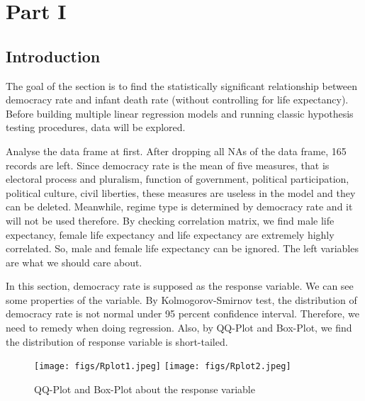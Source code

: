 
\section{Part I}

\subsection{Introduction}
The goal of the section is to find the statistically significant relationship between democracy rate and infant death rate (without controlling for life expectancy). Before building multiple linear regression models and running classic hypothesis testing procedures, data will be explored.

Analyse the data frame at first. After dropping all NAs of the data frame, 165 records are left. Since democracy rate is the mean of five measures, that is electoral process and pluralism, function of government, political participation, political culture, civil liberties, these measures are useless in the model and they can be deleted. Meanwhile, regime type is determined by democracy rate and it will not be used therefore. By checking correlation matrix, we find male life expectancy, female life expectancy and life expectancy are extremely highly correlated. So, male and female life expectancy can be ignored. The left variables are what we should care about.

In this section, democracy rate is supposed as the response variable. We can see some properties of the variable. By Kolmogorov-Smirnov test, the distribution of democracy rate is not normal under 95 percent confidence interval. Therefore, we need to remedy when doing regression. Also, by QQ-Plot and Box-Plot, we find the distribution of response variable is short-tailed.

\begin{figure}[!htbp]
\centering 
        \texttt{[image: figs/Rplot1.jpeg]}
        \texttt{[image: figs/Rplot2.jpeg]}
\caption[QQ-Plot and Box-Plot about the response variable]{QQ-Plot and Box-Plot about the response variable}
\label{fig:example} 
\end{figure}


